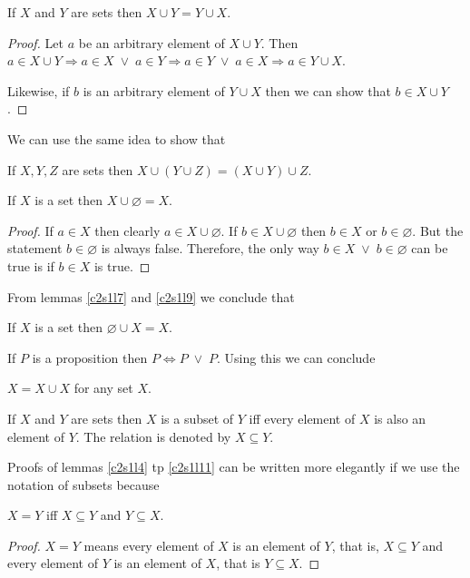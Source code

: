 \begin{lem}\label{c2s1l7}
If $X$ and $Y$ are sets then $X \cup Y = Y \cup X$.
\end{lem}
\begin{proof}
Let $a$ be an arbitrary element of $X \cup Y$. Then
$a \in X \cup Y \Rightarrow a \in X \;\lor\; a \in Y \Rightarrow a \in Y
\;\lor\; a \in X \Rightarrow a \in Y \cup X$.

Likewise, if $b$ is an arbitrary element of $Y \cup X$ then we can show 
that $b \in X \cup Y$.
\end{proof}

We can use the same idea to show that
\begin{lem}\label{c2s1l8}
If $X, Y, Z$ are sets then $X \cup (Y \cup Z) = (X \cup Y) \cup Z$.
\end{lem}

\begin{lem}\label{c2s1l9}
If $X$ is a set then $X \cup \varnothing = X$.
\end{lem}
\begin{proof}
If $a \in X$ then clearly $a \in X \cup \varnothing$. If $b \in X \cup
\varnothing$ then $b \in X$ or $b \in \varnothing$. But the statement $b 
\in \varnothing$ is always false. Therefore, the only way $b \in X 
\;\lor\; b \in \varnothing$ can be true is if $b \in X$ is true.
\end{proof}

From lemmas \ref{c2s1l7} and \ref{c2s1l9} we conclude that
\begin{lem}\label{c2s1l10}
If $X$ is a set then $\varnothing \cup X = X$.
\end{lem}

If $P$ is a proposition then $P \Leftrightarrow P \;\lor\; P$. Using this
we can conclude 
\begin{lem}\label{c2s1l11}
$X = X \cup X$ for any set $X$.
\end{lem}

\begin{defn}\label{c2s1d1}
If $X$ and $Y$ are sets then $X$ is a subset of $Y$ iff every element of 
$X$ is also an element of $Y$. The relation is denoted by $X \subseteq Y$.
\end{defn}

Proofs of lemmas \ref{c2s1l4} tp \ref{c2s1l11} can be written more 
elegantly if we use the notation of subsets because
\begin{lem}\label{c2s1l12}
$X = Y$ iff $X \subseteq Y$ and $Y \subseteq X$.
\end{lem}
\begin{proof}
$X = Y$ means every element of $X$ is an element of $Y$, that is, $X 
\subseteq Y$ and every element of $Y$ is an element of $X$, that is $Y 
\subseteq X$.
\end{proof}

